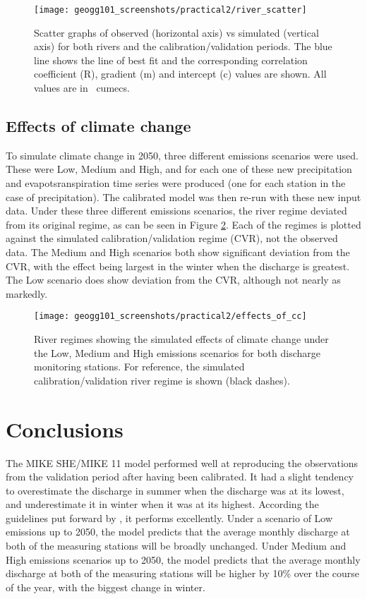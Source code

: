 \documentclass{article}
\begin{document}
\begin{figure}[!h]
    \centering
    \texttt{[image: geogg101\_screenshots/practical2/river\_scatter]}
    \caption{Scatter graphs of observed (horizontal axis) vs simulated (vertical axis) for both rivers and the calibration/validation periods. The blue line shows the line of best fit and the corresponding correlation coefficient (R), gradient (m) and intercept (c) values are shown. All values are in \SI{}{cumecs}.}
    \label{fig:river_scatter}
\end{figure}

\newpage

\subsection{Effects of climate change}

To simulate climate change in 2050, three different emissions scenarios were used. These were Low, Medium and High, and for each one of these new precipitation and evapotsranspiration time series were produced (one for each station in the case of precipitation). The calibrated model was then re-run with these new input data. Under these three different emissions scenarios, the river regime deviated from its original regime, as can be seen in Figure \ref{fig:effects_of_cc}. Each of the regimes is plotted against the simulated calibration/validation regime (CVR), not the observed data. The Medium and High scenarios both show significant deviation from the CVR, with the effect being largest in the winter when the discharge is greatest. The Low scenario does show deviation from the CVR, although not nearly as markedly.

\begin{figure}[!h]
    \centering
    \texttt{[image: geogg101\_screenshots/practical2/effects\_of\_cc]}
    \caption{River regimes showing the simulated effects of climate change under the Low, Medium and High emissions scenarios for both discharge monitoring stations. For reference, the simulated calibration/validation river regime is shown (black dashes). }
    \label{fig:effects_of_cc}
\end{figure}

\section{Conclusions}

The MIKE SHE/MIKE 11 model performed well at reproducing the observations from the validation period after having been calibrated.
It had a slight tendency to overestimate the discharge in summer when the discharge was at its lowest, and underestimate it in winter when it was at its highest.
According the guidelines put forward by \textcite{henriksen2008assessment}, it performs excellently.
Under a scenario of Low emissions up to 2050, the model predicts that the average monthly discharge at both of the measuring stations will be broadly unchanged.
Under Medium and High emissions scenarios up to 2050, the model predicts that the average monthly discharge at both of the measuring stations will be higher by 10\% over the course of the year, with the biggest change in winter.


\printbibliography[filter=practical2]
\end{document}
